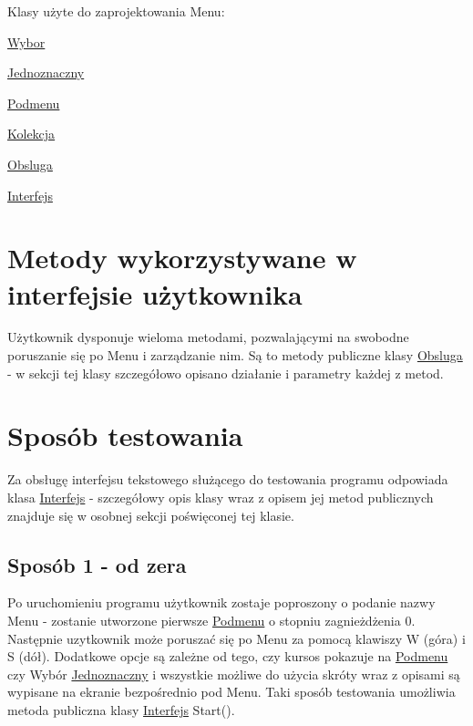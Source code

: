 Klasy użyte do zaprojektowania Menu\-:


\begin{DoxyEnumerate}
\item \hyperlink{classWybor}{Wybor}
\begin{DoxyItemize}
\item \hyperlink{classJednoznaczny}{Jednoznaczny}
\item \hyperlink{classPodmenu}{Podmenu}
\end{DoxyItemize}
\item \hyperlink{classKolekcja}{Kolekcja}
\item \hyperlink{classObsluga}{Obsluga}
\item \hyperlink{classInterfejs}{Interfejs}
\end{DoxyEnumerate}

\section*{Metody wykorzystywane w interfejsie użytkownika}

Użytkownik dysponuje wieloma metodami, pozwalającymi na swobodne poruszanie się po Menu i zarządzanie nim. Są to metody publiczne klasy \hyperlink{classObsluga}{Obsluga} -\/ w sekcji tej klasy szczegółowo opisano działanie i parametry każdej z metod.

\section*{Sposób testowania}

Za obsługę interfejsu tekstowego służącego do testowania programu odpowiada klasa \hyperlink{classInterfejs}{Interfejs} -\/ szczegółowy opis klasy wraz z opisem jej metod publicznych znajduje się w osobnej sekcji poświęconej tej klasie.

\subsection*{Sposób 1 -\/ od zera}

Po uruchomieniu programu użytkownik zostaje poproszony o podanie nazwy Menu -\/ zostanie utworzone pierwsze \hyperlink{classPodmenu}{Podmenu} o stopniu zagnieżdżenia 0. Następnie uzytkownik może poruszać się po Menu za pomocą klawiszy W (góra) i S (dół). Dodatkowe opcje są zależne od tego, czy kursos pokazuje na \hyperlink{classPodmenu}{Podmenu} czy Wybór \hyperlink{classJednoznaczny}{Jednoznaczny} i wszystkie możliwe do użycia skróty wraz z opisami są wypisane na ekranie bezpośrednio pod Menu. Taki sposób testowania umożliwia metoda publiczna klasy \hyperlink{classInterfejs}{Interfejs} Start().

